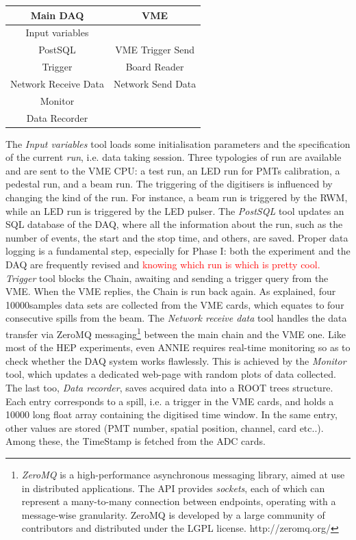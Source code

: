 \begin{center}
  \small
  \begin{tabular}{cc}
    \toprule
    \textbf{Main DAQ}	& \textbf{VME}		\\
    \midrule
    Input variables 		&   \\
    PostSQL 			& VME Trigger Send   \\
    Trigger			& Board Reader	\\
    Network Receive Data	& Network Send Data	\\
    Monitor			& 	\\
    Data Recorder		& 	\\
    \bottomrule
  \end{tabular}
\end{center}

The \emph{Input variables} tool loads some initialisation parameters and the specification of %
the current \emph{run}, i.e. data taking session.
Three typologies of run are available and are sent to the VME CPU: a test run, an LED run for PMTs %
calibration, a pedestal run, and a beam run.
The triggering of the digitisers is influenced by changing the kind of the run.
For instance, a beam run is triggered by the RWM, while an LED run is triggered by the LED pulser.
The \emph{PostSQL} tool updates an SQL database of the DAQ, where all the information about %
the run, such as the number of events, the start and the stop time, and others, are saved.
Proper data logging is a fundamental step, especially for Phase I: both the experiment and the DAQ %
are frequently revised and \textcolor{red}{knowing which run is which is pretty cool.}
\emph{Trigger} tool blocks the Chain, awaiting and sending a trigger query from the VME.
When the VME replies, the Chain is run back again.
As explained, four 10000samples data sets are collected from the VME cards, which equates to %
four consecutive spills from the beam.
The \emph{Network receive data} tool handles the data transfer via ZeroMQ %
messaging\footnote{\emph{ZeroMQ} %
  is a high-performance asynchronous messaging library, aimed at use in distributed applications.
  The API provides \emph{sockets}, each of which can represent a many-to-many connection %
  between endpoints, operating with a message-wise granularity.
  ZeroMQ is developed by a large community of contributors and distributed under the LGPL license.
  http://zeromq.org/} %
between the main chain and the VME one.
Like most of the HEP experiments, even ANNIE requires real-time monitoring so as to check whether %
the DAQ system works flawlessly.
This is achieved by the \emph{Monitor} tool, which updates a dedicated web-page with %
random plots of data collected.
The last too, \emph{Data recorder}, saves acquired data into a ROOT trees structure.
Each entry corresponds to a spill, i.e. a trigger in the VME cards, and holds a 10000 long float %
array containing the digitised time window.
In the same entry, other values are stored (PMT number, spatial position, channel, card etc..).
Among these, the TimeStamp is fetched from the ADC cards.

